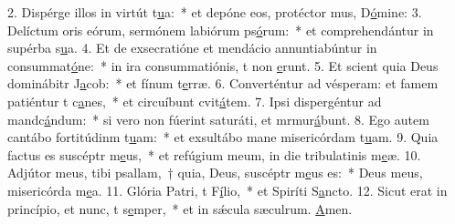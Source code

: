 2. Dispérge illos in virtút t\uline{u}a:~* et depóne eos, protéctor mus, D\uline{ó}mine:
3. Delíctum oris eórum, sermónem labiórum ps\uline{ó}rum:~* et comprehendántur in supérba s\uline{u}a.
4. Et de exsecratióne et mendácio annuntiabúntur in consummat\uline{ó}ne:~* in ira consummatiónis, t non \uline{e}runt.
5. Et scient quia Deus dominábitr J\uline{a}cob:~* et fínum t\uline{e}rræ.
6. Converténtur ad vésperam: et famem patiéntur t c\uline{a}nes,~* et circuíbunt cvit\uline{á}tem.
7. Ipsi dispergéntur ad mandc\uline{á}ndum:~* si vero non fúerint saturáti, et mrmur\uline{á}bunt.
8. Ego autem cantábo fortitúdinm t\uline{u}am:~* et exsultábo mane misericórdam t\uline{u}am.
9. Quia factus es suscéptr m\uline{e}us,~* et refúgium meum, in die tribulatinis m\uline{e}æ.
10. Adjútor meus, tibi psallam,~† quia, Deus, suscéptr m\uline{e}us es:~* Deus meus, misericórda m\uline{e}a.
11. Glória Patri, t F\uline{í}lio,~* et Spiríti S\uline{a}ncto.
12. Sicut erat in princípio, et nunc, t s\uline{e}mper,~* et in sǽcula sæculrum. \uline{A}men.
